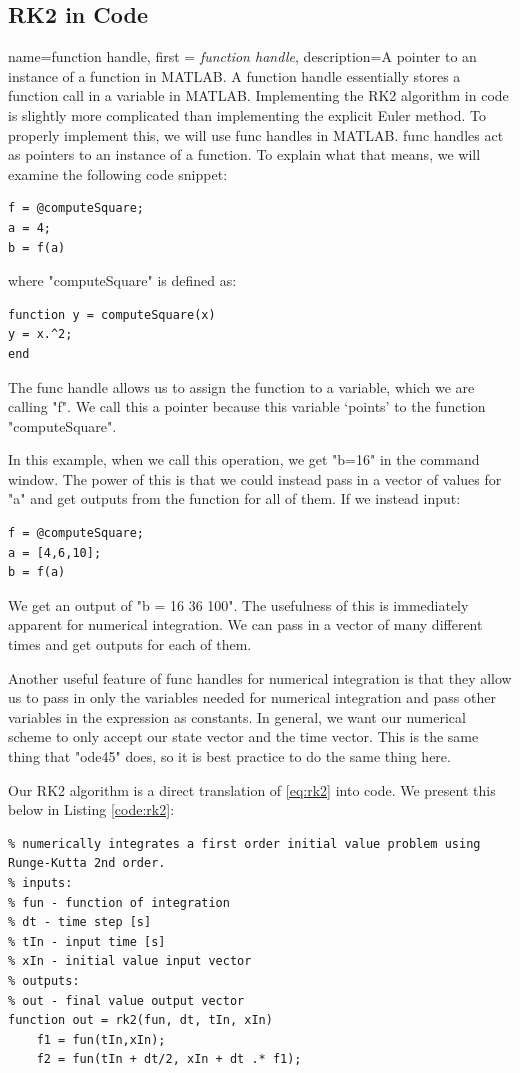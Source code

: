 \documentclass[12pt]{report}
\begin{document}
{\subsection{RK2 in Code}
{
    name=function handle,
    first = {\textit{function handle}},
    description={A pointer to an instance of a function in MATLAB. A function handle essentially stores a function call in a variable in MATLAB.}
}
Implementing the RK2 algorithm in code is slightly more complicated than implementing the explicit Euler method. To properly implement this, we will use \glspl{func handle} in MATLAB. \Glspl{func handle} act as pointers to an instance of a function. To explain what that means, we will examine the following code snippet:
\begin{lstlisting}[style=Matlab-editor]
f = @computeSquare;
a = 4;
b = f(a)
\end{lstlisting}
where "computeSquare" is defined as:
\lstset{style=mystyle}
\begin{lstlisting}[style=Matlab-editor]
function y = computeSquare(x)
y = x.^2;
end
\end{lstlisting}
The \gls{func handle} allows us to assign the function to a variable, which we are calling "f". We call this a pointer because this variable ‘points’ to the function "computeSquare".

In this example, when we call this operation, we get "b=16" in the command window. The power of this is that we could instead pass in a vector of values for "a" and get outputs from the function for all of them. If we instead input:
\begin{lstlisting}[style=Matlab-editor]
f = @computeSquare;
a = [4,6,10];
b = f(a)
\end{lstlisting}
We get an output of "b = 16  36  100". The usefulness of this is immediately apparent for numerical integration. We can pass in a vector of many different times and get outputs for each of them. 

Another useful feature of \glspl{func handle} for numerical integration is that they allow us to pass in only the variables needed for numerical integration and pass other variables in the expression as constants. In general, we want our numerical scheme to only accept our \gls{state vector} and the time vector. This is the same thing that "ode45" does, so it is best practice to do the same thing here.

Our RK2 algorithm is a direct translation of \eqref{eq:rk2} into code. We present this below in Listing \ref{code:rk2}:
\begin{lstlisting}[style=Matlab-editor, caption=RK2 Integrator]
%% RK2 Integrator
% numerically integrates a first order initial value problem using Runge-Kutta 2nd order.
% inputs:
% fun - function of integration
% dt - time step [s]
% tIn - input time [s]
% xIn - initial value input vector
% outputs:
% out - final value output vector
function out = rk2(fun, dt, tIn, xIn)
    f1 = fun(tIn,xIn);
    f2 = fun(tIn + dt/2, xIn + dt .* f1);
    

\end{lstlisting}}
\end{document}
